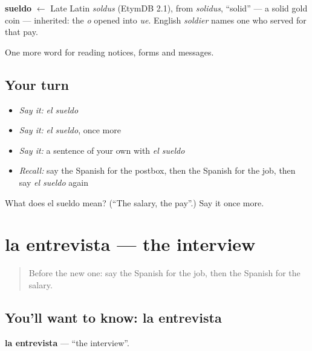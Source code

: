 \begin{cousinweb}
\textbf{sueldo} $\leftarrow$ Late Latin \emph{soldus} (EtymDB 2.1), from \emph{solidus}, \textquotedblleft{}solid\textquotedblright{} — a solid gold coin — inherited: the \emph{o} opened into \emph{ue}. English \emph{soldier} names one who served for that pay.
\end{cousinweb}

\begin{grammarlens}[title={What you've built}]
One more word for reading notices, forms and messages.
\end{grammarlens}

\subsection*{Your turn}
\begin{itemize}
\raggedright
  \item \emph{Say it:} \emph{el sueldo}
  \item \emph{Say it:} \emph{el sueldo}, once more
  \item \emph{Say it:} a sentence of your own with \emph{el sueldo}
  \item \emph{Recall:} say the Spanish for the postbox, then the Spanish for the job, then say \emph{el sueldo} again
\end{itemize}

\begin{tcolorbox}[breakable,colback=teal!4,colframe=teal!35!black,title={Before you move on}]
What does el sueldo mean? (\textquotedblleft{}The salary, the pay\textquotedblright{}.) Say it once more.
\end{tcolorbox}
\section[la entrevista]{la entrevista — the interview}

\label{lesson:ES-C490-entrevista}



\begin{quote}
Before the new one: say the Spanish for the job, then the Spanish for the salary.
\end{quote}

\subsection*{You'll want to know: la entrevista}
\textbf{la entrevista} — \textquotedblleft{}the interview\textquotedblright{}.

